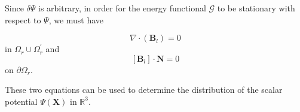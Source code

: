 \begin{multicols}{2}
Since $\delta\Psi$ is arbitrary, in order for the energy functional $\mathcal{G}$ to be stationary with respect to $\Psi$, we must have

\begin{equation} \label{eq:24}
    \nabla\cdot(\textbf{B}_{l}) = 0
\end{equation}
in $\Omega_{r} \cup \Omega_{r}^{\prime}$ and 
\begin{equation} \label{eq:24}
    [\textbf{B}_{l}] \cdot \textbf{N} = 0
\end{equation}
on $\partial\Omega_{r}$.

These two equations can be used to determine the distribution of the scalar potential $\Psi(\textbf{X})$ in $\mathbb{R}^{3}$. 
































\end{multicols}